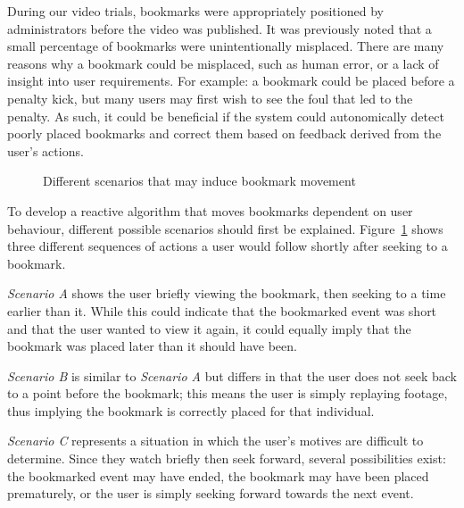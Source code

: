 \documentclass[a4paper,11pt]{article}
\begin{document}
During our video trials, bookmarks were appropriately positioned by administrators before the video was published. It was previously noted that a small percentage of bookmarks were unintentionally misplaced. There are many reasons why a bookmark could be misplaced, such as human error, or a lack of insight into user requirements. For example: a bookmark could be placed before a penalty kick, but many users may first wish to see the foul that led to the penalty. As such, it could be beneficial if the system could autonomically detect poorly placed bookmarks and correct them based on feedback derived from the user's actions.



\begin{figure}[tbp]
    \centering

    

    \caption{Different scenarios that may induce bookmark movement}
    \label{fig:movingbookmark}
\end{figure}

To develop a reactive algorithm that moves bookmarks dependent on user behaviour, different possible scenarios should first be explained. Figure~\ref{fig:movingbookmark} shows three different sequences of actions a user would follow shortly after seeking to a bookmark.

\emph{Scenario A} shows the user briefly viewing the bookmark, then seeking to a time earlier than it. While this could indicate that the bookmarked event was short and that the user wanted to view it again, it could equally imply that the bookmark was placed later than it should have been.

\emph{Scenario B} is similar to \emph{Scenario A} but differs in that the user does not seek back to a point before the bookmark; this means the user is simply replaying footage, thus implying the bookmark is correctly placed for that individual.

\emph{Scenario C} represents a situation in which the user's motives are difficult to determine. Since they watch briefly then seek forward, several possibilities exist: the bookmarked event may have ended, the bookmark may have been placed prematurely, or the user is simply seeking forward towards the next event.
\end{document}
